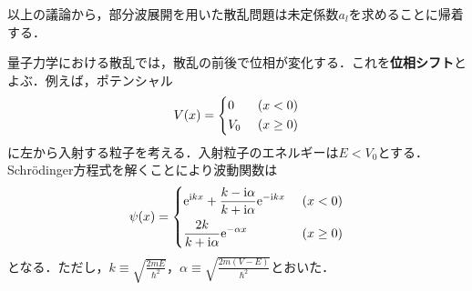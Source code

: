 \documentclass{report}
\begin{document}
  以上の議論から，部分波展開を用いた散乱問題は未定係数$a_l$を求めることに帰着する．

  量子力学における散乱では，散乱の前後で位相が変化する．これを\textbf{位相シフト}とよぶ．例えば，ポテンシャル
  \begin{align}
    V(x) = 
    \begin{dcases}
      0\ &(x < 0)\\
      V_0\ &(x \geq 0)
    \end{dcases}
  \end{align}
  に左から入射する粒子を考える．入射粒子のエネルギーは$E<V_0$とする．Schrödinger方程式を解くことにより波動関数は
  \begin{align}
    \psi(x) = 
    \begin{dcases}
      \mathrm{e}^{\mathrm{i} kx} + \frac{k -\mathrm{i}\alpha}{k + \mathrm{i}\alpha} \mathrm{e}^{-\mathrm{i} kx}\ &(x < 0)\\
      \frac{2k}{k + \mathrm{i}\alpha}\mathrm{e}^{-\alpha x}\ &(x \geq 0)
    \end{dcases}
  \end{align}
  となる．ただし，$k \equiv \sqrt{\frac{2mE}{\hbar^2}}，\alpha \equiv \sqrt{\frac{2m(V-E)}{\hbar^2}}$とおいた．
\end{document}
